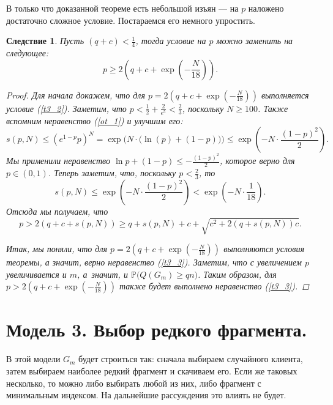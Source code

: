 \documentclass{matmex-diploma-custom}
\newcommand{\PRob}{\mathbb P}
\newcommand{\leqs}{\leqslant}
\newcommand{\geqs}{\geqslant}
\newtheorem{cons}{Следствие}
\theoremstyle{named}
\begin{document}
В только что доказанной теореме есть небольшой изъян --- на $p$ наложено достаточно сложное условие. 
Постараемся его немного упростить.
\begin{cons}
Пусть $(q+c) < \frac{1}{4}$, тогда условие на $p$ можно заменить на следующее:
\begin{equation}
p \geqs 2\left(q + c + \exp\left(-\frac{N}{18}\right) \right).
\end{equation}

\begin{proof}
Для начала докажем, что для $p = 2\left(q + c + \exp\left(-\frac{N}{18}\right) \right)$ выполняется условие (\ref{t3_2}).
Заметим, что $p < \frac{1}{2} + \frac{2}{e^5} < \frac{2}{3}$, поскольку $N \geqs 100$.
Также вспомним неравенство (\ref{ot_1}) и улучшим его:
\begin{equation}
s(p, N) \leqs (e^{1-p} p)^N 
	=
\exp\Big(N\cdot \big( \ln(p) + (1-p) \big)\Big)
	\leqs
\exp\left( - N \cdot \frac{(1-p)^2}{2}\right).
\end{equation}
Мы применили неравенство $\ln p + (1-p) \leqs - \frac{(1-p)^2}{2}$, которое верно для $p\in(0,1)$.
Теперь заметим, что, поскольку $p < \frac{2}{3}$, то 
\begin{equation}
s(p, N) \leqs \exp\left( - N \cdot \frac{(1-p)^2}{2}\right) < \exp\left( - N\cdot \frac{1}{18}\right).
\end{equation}
Отсюда мы получаем, что 
\begin{equation}
p > 2(q+c+s(p,N)) \geqs q + s(p, N) + c + \sqrt{c^2+2(q+s(p, N))c}.
\end{equation}

Итак, мы поняли, что для $p = 2\left(q + c + \exp\left(-\frac{N}{18}\right) \right)$ выполняются условия теоремы, 
а значит, верно неравенство (\ref{t3_3}). 
Заметим, что с увеличением $p$ увеличивается и $m$, а~значит, и $\PRob\big(Q(G_m) \geqs qn\big)$.
Таким образом, для $p > 2\left(q + c + \exp\left(-\frac{N}{18}\right) \right)$ также будет выполнено неравенство (\ref{t3_3}).
\end{proof}
\end{cons}


\newpage
\section*{Модель 3. Выбор редкого фрагмента.}

В этой модели $G_m$ будет строиться так: сначала выбираем случайного клиента, затем выбираем наиболее редкий фрагмент и скачиваем его.
Если же таковых несколько, то можно либо выбирать любой из них, либо фрагмент с минимальным индексом. 
На дальнейшие рассуждения это влиять не будет.
\end{document}
